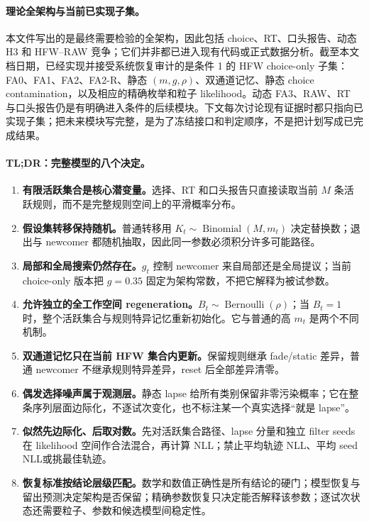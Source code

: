 \paragraph{理论全架构与当前已实现子集。}
本文件写出的是最终需要检验的全架构，因此包括 choice、RT、口头报告、动态 H3 和 HFW--RAW 竞争；它们并非都已进入现有代码或正式数据分析。截至本文档日期，已经实现并接受系统恢复审计的是条件 1 的 HFW choice-only 子集：FA0、FA1、FA2、FA2-R、静态 $(m,g,\rho)$、双通道记忆、静态 choice contamination，以及相应的精确枚举和粒子 likelihood。动态 FA3、RAW、RT 与口头报告仍是有明确进入条件的后续模块。下文每次讨论现有证据时都只指向已实现子集；把未来模块写完整，是为了冻结接口和判定顺序，不是把计划写成已完成结果。

\paragraph{TL;DR：完整模型的八个决定。}
\begin{enumerate}
    \item \textbf{有限活跃集合是核心潜变量。}选择、RT 和口头报告只直接读取当前 $M$ 条活跃规则，而不是完整规则空间上的平滑概率分布。
    \item \textbf{假设集转移保持随机。}普通转移用 $K_t\sim\operatorname{Binomial}(M,m_t)$ 决定替换数；退出与 newcomer 都随机抽取，因此同一参数必须积分许多可能路径。
    \item \textbf{局部和全局搜索仍然存在。}$g_t$ 控制 newcomer 来自局部还是全局提议；当前 choice-only 版本把 $g=0.35$ 固定为架构常数，不把它解释为被试参数。
    \item \textbf{允许独立的全工作空间 regeneration。}$B_t\sim\operatorname{Bernoulli}(\rho)$；当 $B_t=1$ 时，整个活跃集合与规则特异记忆重新初始化。它与普通的高 $m_t$ 是两个不同机制。
    \item \textbf{双通道记忆只在当前 HFW 集合内更新。}保留规则继承 fade/static 差异，普通 newcomer 不继承规则特异差异，reset 后全部差异清零。
    \item \textbf{偶发选择噪声属于观测层。}静态 lapse 给所有类别保留非零污染概率；它在整条序列层面边际化，不逐试次变化，也不标注某一个真实选择“就是 lapse”。
    \item \textbf{似然先边际化、后取对数。}先对活跃集合路径、lapse 分量和独立 filter seeds 在 likelihood 空间作合法混合，再计算 NLL；禁止平均轨迹 NLL、平均 seed NLL或挑最佳轨迹。
    \item \textbf{恢复标准按结论层级匹配。}数学和数值正确性是所有结论的硬门；模型恢复与留出预测决定架构是否保留；精确参数恢复只决定能否解释该参数；逐试次状态还需要粒子、参数和候选模型间稳定性。
\end{enumerate}


